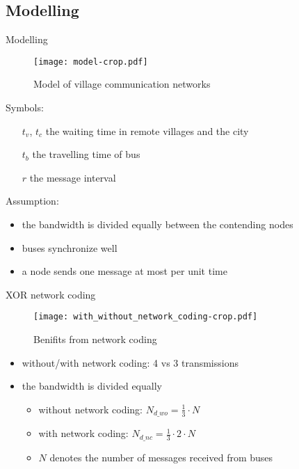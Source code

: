 \documentclass[compress]{beamer}
\begin{document}
\subsection{Modelling}
\begin{frame}{Modelling}
	\begin{figure}[!t]
		\centering
		\texttt{[image: model-crop.pdf]}
		\caption{Model of village communication networks}
		\label{f_modeling}
	\end{figure}
	
	Symbols:
	\begin{itemize}
		\item[$t_v$, $t_c$] the waiting time in remote villages and the city
		\item[$t_b$] the travelling time of bus 
		\item[$r$] the message interval
	\end{itemize}
	
	Assumption:
	\begin{itemize}
		\item the bandwidth is divided equally between the contending nodes
		\item buses synchronize well
		\item a node sends one message at most per unit time
	\end{itemize}
\end{frame}

\begin{frame}{XOR network coding}
	\begin{figure}[!t]
		\centering
		\texttt{[image: with\_without\_network\_coding-crop.pdf]}
		\caption{Benifits from network coding}
		\label{f_xor_network_coding_benifits}
	\end{figure}
	\begin{itemize}
		\item without/with network coding: 4 vs 3 transmissions
		\item the bandwidth is divided equally
		      \begin{itemize}
		      	\item without network coding: $N_{d\_wo} = \frac{1}{3} \cdot N$
		      	\item with network coding: $N_{d\_nc} = \frac{1}{3} \cdot 2 \cdot N$
		      	\item $N$ denotes the number of messages received from buses
		      \end{itemize}
	\end{itemize}
\end{frame}
\end{document}
